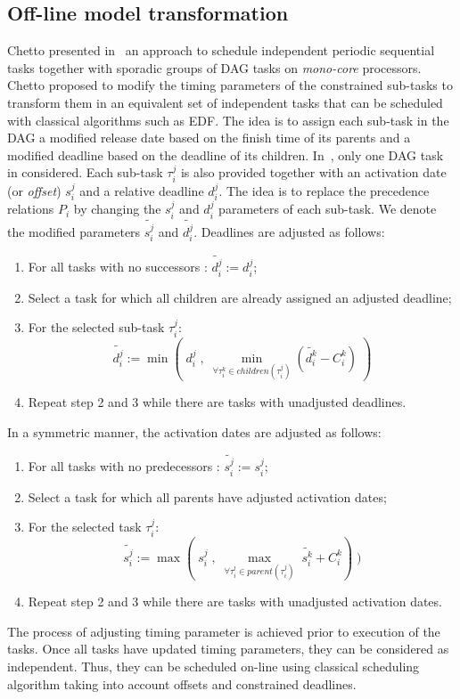 \documentclass[main.tex]{subfiles}
\begin{document}
\subsection{Off-line model transformation}
Chetto \etal presented in~\cite{Chetto1990} an approach to schedule independent periodic sequential tasks together with sporadic groups of DAG tasks on \emph{mono-core} processors. Chetto \etal proposed to modify the timing parameters of the constrained sub-tasks to transform them in an equivalent set of independent tasks that can be scheduled with classical algorithms such as EDF. The idea is to assign each sub-task in the DAG a modified release date based on the finish time of its parents and a modified deadline based on the deadline of its children.
In~\cite{Chetto1990}, only one DAG task in considered. Each sub-task $\tau_i^j$ is also provided together with an activation date (or \emph{offset}) $s_i^j$ and a relative deadline $d_i^j$. The idea is to replace the precedence relations $P_i$ by changing the $s_i^j$ and $d_i^j$ parameters of each sub-task. We denote the modified parameters $ \widetilde{s_i^j}$ and $ \widetilde{d_i^j} $.
 Deadlines are adjusted as follows:
\begin{enumerate}
    \item For all tasks with no successors : $\widetilde{d_i^j} := d_i^j$;
    \item Select a task for which all children are already assigned an adjusted deadline;
    \item For the selected sub-task $\tau_i^j$: 
        \begin{displaymath}
            \widetilde{d_i^j} := \min ( \; d_i^j \; , \; \underset{\forall \tau_i^k \in children(\tau_i^j)}{\min} ( \widetilde{d_i^k} - C_i^k) \; )
        \end{displaymath}
    \item Repeat step 2 and 3 while there are tasks with unadjusted deadlines.
\end{enumerate}
In a symmetric manner, the activation dates are adjusted as follows:
\begin{enumerate}
    \item For all tasks with no predecessors : $ \widetilde{s_i^j} := s_i^j$;
    \item Select a task for which all parents have adjusted activation dates;
    \item For the selected task $\tau_i^j$:
        \begin{displaymath}
            \widetilde{s_i^j} := \max ( \; s_i^j \; , \; \underset{\forall \tau_i^l \in parent(\tau_i^j)}{\max} \; \widetilde{s_i^k} + C_i^k) \; )
        \end{displaymath}
    \item Repeat step 2 and 3 while there are tasks with unadjusted activation dates.
\end{enumerate}
The process of adjusting timing parameter is achieved prior to execution of the tasks. Once all tasks have updated timing parameters, they can be considered as independent. Thus, they can be scheduled on-line using classical scheduling algorithm taking into account offsets and constrained deadlines. 
\end{document}
